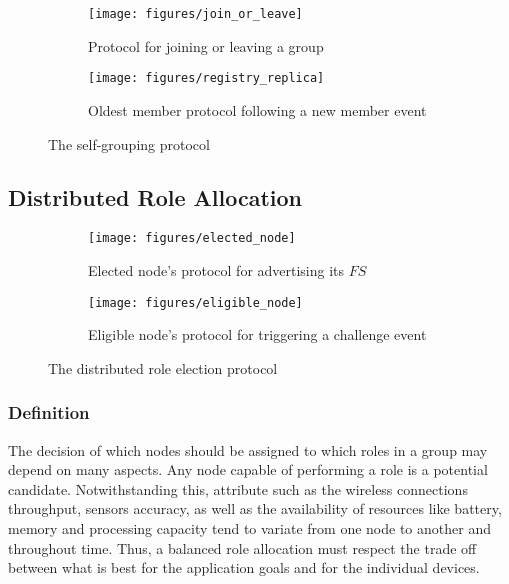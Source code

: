 
\begin{figure}[t!]
	\centering
	\begin{subfigure}[b]{0.45\textwidth}
		\centering
		\texttt{[image: figures/join\_or\_leave]}
		\caption{Protocol for joining or leaving a group}
		\label{fig:join_or_leave}
	\end{subfigure}%
	
	\begin{subfigure}[b]{0.45\textwidth}
		\centering
		\texttt{[image: figures/registry\_replica]}
		\caption{Oldest member protocol following a new member event}
		\label{fig:registry_replica}
	\end{subfigure}
	\caption{The self-grouping protocol}
	\label{fig:self_grouping}
\end{figure}




 
\subsection{Distributed Role Allocation} 


\begin{figure}[t!]
	\centering
	\begin{subfigure}[b]{0.45\textwidth}
		\centering
		\texttt{[image: figures/elected\_node]}
		\caption{Elected node's protocol for advertising its $FS$}
		\label{fig:elected_node}
	\end{subfigure}%
	
	\begin{subfigure}[b]{0.55\textwidth}
		\centering
		\texttt{[image: figures/eligible\_node]}
		\caption{Eligible node's protocol for triggering a challenge event}
		\label{fig:eligible_node}
	\end{subfigure}
	\caption{The distributed role election protocol}
	\label{fig:role_allocation}
\end{figure}
 
\subsubsection{\textbf{Definition}} The decision of which nodes should be assigned to which roles in a group may depend on many aspects. Any node capable of performing a role is a potential candidate. Notwithstanding this, attribute such as the wireless connections throughput, sensors accuracy, as well as the availability of resources like battery, memory and processing capacity tend to variate from one node to another and throughout time. Thus, a balanced role allocation must respect the trade off between what is best for the application goals and for the individual devices. 

